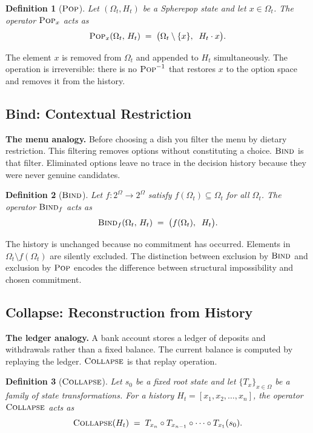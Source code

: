 \documentclass[12pt]{article}
\newtheorem{definition}{Definition}[section]
\newcommand{\Pop}{\operatorname{\textsc{Pop}}}
\newcommand{\Bind}{\operatorname{\textsc{Bind}}}
\newcommand{\Collapse}{\operatorname{\textsc{Collapse}}}
\newcommand{\Option}{\Omega}
\newcommand{\Seq}[1]{\left[#1\right]}
\newcommand{\Append}{\mathbin{\cdot}}
\begin{document}
\begin{definition}[$\Pop$]
Let $(\Option_t, H_t)$ be a Spherepop state and let $x \in \Option_t$. The operator $\Pop_x$ acts as
\[
\Pop_x(\Option_t,\, H_t) \;=\; \bigl(\Option_t \setminus \{x\},\;\; H_t \Append x\bigr).
\]
\end{definition}

The element $x$ is removed from $\Option_t$ and appended to $H_t$ simultaneously. The operation is irreversible: there is no $\Pop^{-1}$ that restores $x$ to the option space and removes it from the history.

\subsection{Bind: Contextual Restriction}

\medskip\noindent\textbf{The menu analogy.} Before choosing a dish you filter the menu by dietary restriction. This filtering removes options without constituting a choice. $\Bind$ is that filter. Eliminated options leave no trace in the decision history because they were never genuine candidates.\medskip

\begin{definition}[$\Bind$]
Let $f : 2^\Option \to 2^\Option$ satisfy $f(\Option_t) \subseteq \Option_t$ for all $\Option_t$. The operator $\Bind_f$ acts as
\[
\Bind_f(\Option_t,\, H_t) \;=\; \bigl(f(\Option_t),\;\; H_t\bigr).
\]
\end{definition}

The history is unchanged because no commitment has occurred. Elements in $\Option_t \setminus f(\Option_t)$ are silently excluded. The distinction between exclusion by $\Bind$ and exclusion by $\Pop$ encodes the difference between structural impossibility and chosen commitment.

\subsection{Collapse: Reconstruction from History}

\medskip\noindent\textbf{The ledger analogy.} A bank account stores a ledger of deposits and withdrawals rather than a fixed balance. The current balance is computed by replaying the ledger. $\Collapse$ is that replay operation.\medskip

\begin{definition}[$\Collapse$]
Let $s_0$ be a fixed root state and let $\{T_x\}_{x \in \Option}$ be a family of state transformations. For a history $H_t = \Seq{x_1, x_2, \ldots, x_n}$, the operator $\Collapse$ acts as
\[
\Collapse(H_t) \;=\; T_{x_n} \circ T_{x_{n-1}} \circ \cdots \circ T_{x_1}(s_0).
\]
\end{definition}
\end{document}
